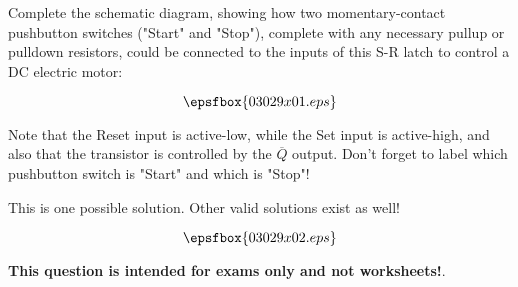 

Complete the schematic diagram, showing how two momentary-contact pushbutton switches ("Start" and "Stop"), complete with any necessary pullup or pulldown resistors, could be connected to the inputs of this S-R latch to control a DC electric motor:

$$\epsfbox{03029x01.eps}$$

Note that the Reset input is active-low, while the Set input is active-high, and also that the transistor is controlled by the $\overline{Q}$ output.  Don't forget to label which pushbutton switch is "Start" and which is "Stop"!







This is one possible solution.  Other valid solutions exist as well!

$$\epsfbox{03029x02.eps}$$







{\bf This question is intended for exams only and not worksheets!}.




